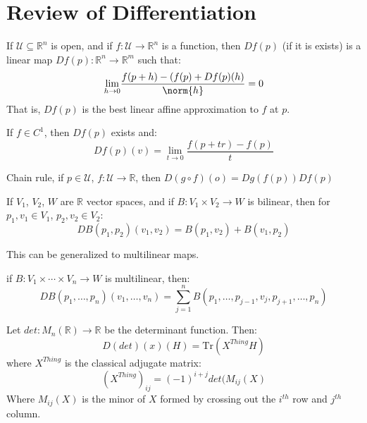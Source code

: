 \section{Review of Differentiation}
    If $\mathcal{U}\subseteq\mathbb{R}^{n}$ is open, and if
    $f:\mathcal{U}\rightarrow\mathbb{R}^{n}$ is a function, then
    $Df(p)$ (if it is exists) is a linear map
    $Df(p):\mathbb{R}^{n}\rightarrow\mathbb{R}^{m}$ such that:
    \begin{equation}
        \underset{h\rightarrow{0}}{\lim}
            \frac{f(p+h)-(f(p)+Df(p)(h)}{\norm{h}}=0
    \end{equation}
    That is, $Df(p)$ is the best linear affine approximation to $f$ at
    $p$.
    \begin{theorem}
        If $f\in{C}^{1}$, then $Df(p)$ exists and:
        \begin{equation}
            Df(p)(v)=\underset{t\rightarrow{0}}{\lim}
            \frac{f(p+tr)-f(p)}{t}
        \end{equation}
    \end{theorem}
    Chain rule, if $p\in\mathcal{U}$,
    $f:\mathcal{U}\rightarrow\mathbb{R}$,
    then $D(g\circ{f})(o)=Dg(f(p))Df(p)$
    \begin{theorem}
        If $V_{1}$, $V_{2}$, $W$ are $\mathbb{R}$ vector spaces, and
        if $B:V_{1}\times{V}_{2}\rightarrow{W}$ is bilinear, then
        for $p_{1},v_{1}\in{V}_{1}$, $p_{2},v_{2}\in{V}_{2}$:
        \begin{equation}
            DB(p_{1},p_{2})(v_{1},v_{2})=B(p_{1},v_{2})+B(v_{1},p_{2})
        \end{equation}
    \end{theorem}
    This can be generalized to multilinear maps.
    \begin{theorem}
        if $B:V_{1}\times\cdots\times{V}_{n}\rightarrow{W}$ is
        multilinear, then:
        \begin{equation}
            DB(p_{1},\dots,p_{n})(v_{1},\dots,v_{n})=
            \sum_{j=1}^{n}B(p_{1},\dots,p_{j-1},v_{j},p_{j+1},\dots,p_{n})
        \end{equation}
    \end{theorem}
    \begin{example}
        Let $det:M_{n}(\mathbb{R})\rightarrow\mathbb{R}$ be the
        determinant function. Then:
        \begin{equation}
            D(det)(x)(H)=\textrm{Tr}(X^{Thing}H)
        \end{equation}
        where $X^{Thing}$ is the classical adjugate matrix:
        \begin{equation}
            (X^{Thing})_{ij}=(\minus{1})^{i+j}det(M_{ij}(X)
        \end{equation}
        Where $M_{ij}(X)$ is the minor of $X$ formed by crossing out the
        $i^{th}$ row and $j^{th}$ column.
    \end{example}
